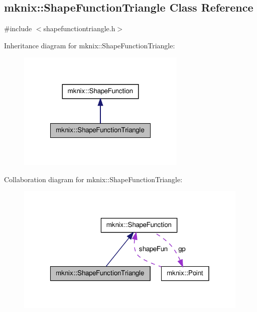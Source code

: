 \hypertarget{classmknix_1_1_shape_function_triangle}{\subsection{mknix\-:\-:Shape\-Function\-Triangle Class Reference}
\label{classmknix_1_1_shape_function_triangle}
}


{\ttfamily \#include $<$shapefunctiontriangle.\-h$>$}



Inheritance diagram for mknix\-:\-:Shape\-Function\-Triangle\-:\nopagebreak
\begin{figure}[H]
\begin{center}
\leavevmode
\includegraphics[width=228pt]{d9/da8/classmknix_1_1_shape_function_triangle__inherit__graph}
\end{center}
\end{figure}


Collaboration diagram for mknix\-:\-:Shape\-Function\-Triangle\-:\nopagebreak
\begin{figure}[H]
\begin{center}
\leavevmode
\includegraphics[width=316pt]{de/dcb/classmknix_1_1_shape_function_triangle__coll__graph}
\end{center}
\end{figure}

